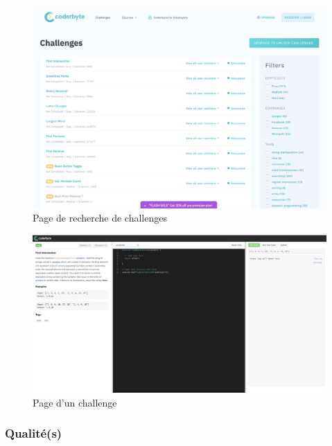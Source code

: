 \begin{figure}[H]
    \includegraphics[width=\textwidth,height=0.5\textheight,keepaspectratio]{images/comparison/coderbyte-1.png}
    \centering
    \caption[Coderbyte : page de recherche de challenges]{Page de recherche de challenges}
\end{figure}

\begin{figure}[H]
    \includegraphics[width=\textwidth,height=0.35\textheight,keepaspectratio=false]{images/comparison/coderbyte-2.png}
    \centering
    \caption[Coderbyte : page d'un challenge]{Page d'un challenge}
\end{figure}

\subsubsection*{Qualité(s)}

